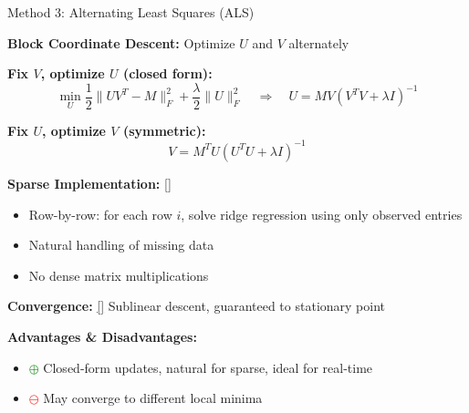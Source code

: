 \documentclass[aspectratio=169,usenames,dvipsnames]{beamer}
\begin{document}
\begin{frame}{Method 3: Alternating Least Squares (ALS)}

\textbf{Block Coordinate Descent:} Optimize $U$ and $V$ alternately

\vspace{0.3cm}

\textbf{Fix $V$, optimize $U$ (closed form):}
\[
\min_U \frac{1}{2}\|UV^T - M\|_F^2 + \frac{\lambda}{2}\|U\|_F^2
\quad \Rightarrow \quad
U = MV(V^TV + \lambda I)^{-1}
\]

\textbf{Fix $U$, optimize $V$ (symmetric):}
\[
V = M^T U(U^T U + \lambda I)^{-1}
\]

\vspace{0.3cm}

\textbf{Sparse Implementation:} \hyperlink{app:als_sparse}{[\checkmark]}
\begin{itemize}
  \item Row-by-row: for each row $i$, solve ridge regression using only observed entries
  \item Natural handling of missing data
  \item No dense matrix multiplications
\end{itemize}

\vspace{0.3cm}

\textbf{Convergence:} \hyperlink{app:als_convergence}{[\checkmark]} Sublinear descent, guaranteed to stationary point

\vspace{0.3cm}

\textbf{Advantages \& Disadvantages:}
\begin{itemize}
  \item \textcolor{green}{$\oplus$} Closed-form updates, natural for sparse, ideal for real-time
  \item \textcolor{red}{$\ominus$} May converge to different local minima
\end{itemize}

\end{frame}
\end{document}

